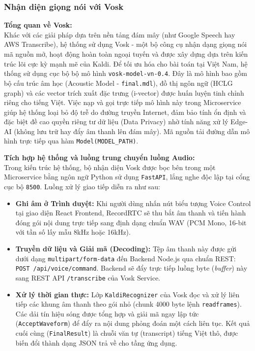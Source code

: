 \subsubsection{Nhận diện giọng nói với Vosk}
\textbf{Tổng quan về Vosk:} \\
Khác với các giải pháp dựa trên nền tảng đám mây (như Google Speech hay AWS Transcribe), hệ thống sử dụng Vosk - một bộ công cụ nhận dạng giọng nói mã nguồn mở, hoạt động hoàn toàn ngoại tuyến và được xây dựng dựa trên kiến trúc lõi cực kỳ mạnh mẽ của Kaldi. Để tối ưu hóa cho bài toán tại Việt Nam, hệ thống sử dụng cục bộ bộ mô hình \texttt{vosk-model-vn-0.4}. Đây là mô hình bao gồm bộ cấu trúc âm học (Acoustic Model - \texttt{final.mdl}), đồ thị ngôn ngữ (HCLG graph) và các vector trích xuất đặc trưng (i-vector) được huấn luyện tinh chỉnh riêng cho tiếng Việt. Việc nạp và gọi trực tiếp mô hình này trong Microservice giúp hệ thống loại bỏ độ trễ do đường truyền Internet, đảm bảo tính ổn định và đặc biệt đề cao quyền riêng tư dữ liệu (Data Privacy) nhờ tính năng xử lý Edge-AI (không lưu trữ hay đẩy âm thanh lên đám mây). Mã nguồn tải đường dẫn mô hình trực tiếp qua hàm \texttt{Model(MODEL\_PATH)}.

\textbf{Tích hợp hệ thống và luồng trung chuyển luồng Audio:} \\
Trong kiến trúc hệ thống, bộ nhận diện Vosk được bọc bên trong một Microservice bằng ngôn ngữ Python sử dụng \texttt{FastAPI}, lắng nghe độc lập tại cổng cục bộ \texttt{8500}. Luồng xử lý giao tiếp diễn ra như sau:
\begin{itemize}
    \item \textbf{Ghi âm ở Trình duyệt:} Khi người dùng nhấn nút biểu tượng Voice Control tại giao diện React Frontend, RecordRTC sẽ thu bắt âm thanh và tiến hành đóng gói nội dung trực tiếp sang định dạng chuẩn WAV (PCM Mono, 16-bit với tần số lấy mẫu 8kHz hoặc 16kHz). 
    \item \textbf{Truyền dữ liệu và Giải mã (Decoding):} Tệp âm thanh này được gửi dưới dạng \texttt{multipart/form-data} đến Backend Node.js qua chuẩn REST: \texttt{POST /api/voice/command}. Backend sẽ đẩy trực tiếp luồng byte (\textit{buffer}) này sang REST API \texttt{/transcribe} của Vosk Service.
    \item \textbf{Xử lý thời gian thực:} Lớp \texttt{KaldiRecognizer} của Vosk đọc và xử lý liên tiếp các khung âm thanh theo gói nhỏ (chunk 4000 byte lệnh \texttt{readframes}). Các dải tín hiệu sóng được tổng hợp và giải mã ngay lập tức (\texttt{AcceptWaveform}) để đẩy ra nội dung phỏng đoán một cách liên tục. Kết quả cuối cùng (\texttt{FinalResult}) là chuỗi văn tự (transcript) tiếng Việt thô, được biến đổi thành dạng JSON trả về cho tầng ứng dụng.
\end{itemize}

